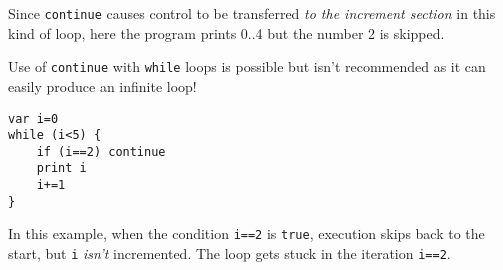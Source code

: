 Since \texttt{continue} causes control to be transferred \emph{to the
increment section} in this kind of loop, here the program prints 0..4
but the number 2 is skipped.

Use of \texttt{continue} with \texttt{while} loops is possible but isn't
recommended as it can easily produce an infinite loop!

\begin{lstlisting}
var i=0
while (i<5) {
    if (i==2) continue
    print i
    i+=1
}
\end{lstlisting}

In this example, when the condition \texttt{i==2} is \texttt{true},
execution skips back to the start, but \texttt{i} \emph{isn't}
incremented. The loop gets stuck in the iteration \texttt{i==2}.
